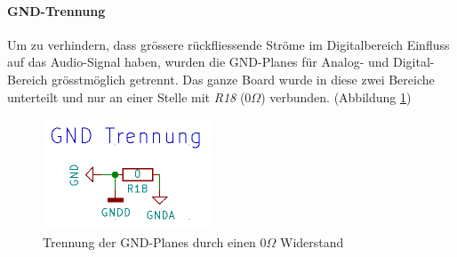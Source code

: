 \paragraph{GND-Trennung}
\label{par:GND}
Um zu verhindern, dass grössere rückfliessende Ströme im Digitalbereich Einfluss auf das Audio-Signal haben, wurden die GND-Planes für Analog- und Digital-Bereich grösstmöglich getrennt. Das ganze Board wurde in diese zwei Bereiche unterteilt und nur an einer Stelle mit \textit{R18} ($0\Omega$) verbunden. (Abbildung \ref{fig:Schema_GND})

\begin{figure} [H]
\begin{center}
 \includegraphics[scale=0.5]{../graphics/Schema_GND.png} 
\caption{Trennung der GND-Planes durch einen $0\Omega$ Widerstand}
\label{fig:Schema_GND}
\end{center}
\end{figure}



 